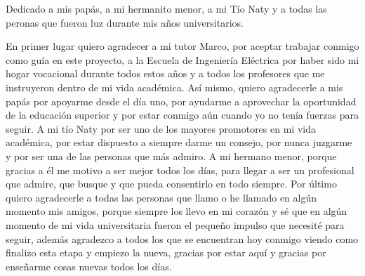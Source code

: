 

\begin{reconocimiento}{Dedicado a mis papás, a mi hermanito menor, a mi Tío Naty y a todas las peronas que fueron luz durante mis años universitarios.}

En primer lugar quiero agradecer a mi tutor Marco, por aceptar trabajar conmigo como guía en este proyecto, a la Escuela de Ingeniería Eléctrica por haber sido mi hogar vocacional durante todos estos años y a todos los profesores que me instruyeron dentro de mi vida académica. Así mismo, quiero agradecerle a mis papás por apoyarme desde el día uno, por ayudarme a aprovechar la oportunidad de la educación superior y por estar conmigo aún cuando yo no tenía fuerzas para seguir. A mi tío Naty por ser uno de los mayores promotores en mi vida académica, por estar dispuesto a siempre darme un consejo, por nunca juzgarme y por ser una de las personas que más admiro. A mi hermano menor, porque gracias a él me motivo a ser mejor todos los días, para llegar a ser un profesional que admire, que busque y que pueda consentirlo en todo siempre. Por último quiero agradecerle a todas las personas que llamo o he llamado en algún momento mis amigos, porque siempre los llevo en mi corazón y sé que en algún momento de mi vida universitaria fueron el pequeño impulso que necesité para seguir, además agradezco a todos los que se encuentran hoy conmigo viendo como finalizo esta etapa y empiezo la nueva, gracias por estar aquí y gracias por enseñarme cosas nuevas todos los días.

\end{reconocimiento}